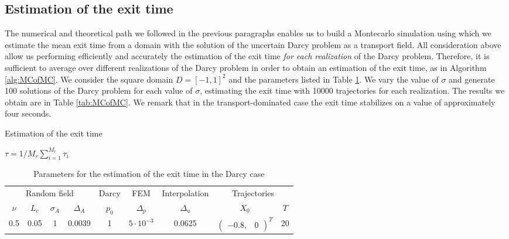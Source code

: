 \subsection{Estimation of the exit time}

The numerical and theoretical path we followed in the previous paragraphs enables us to build a Montecarlo simulation using which we estimate the mean exit time from a domain with the solution of the uncertain Darcy problem as a transport field. All consideration above allow us performing efficiently and accurately the estimation of the exit time \textit{for each realization} of the Darcy problem. Therefore, it is sufficient to average over different realizations of the Darcy problem in order to obtain an estimation of the exit time, as in Algorithm \ref{alg:MCofMC}. We consider the square domain $D = [-1, 1]^2$ and the parameters listed in Table \ref{tab:MCPar}. We vary the value of $\sigma$ and generate 100 solutions of the Darcy problem for each value of $\sigma$, estimating the exit time with 10000 trajectories for each realization. The results we obtain are in Table \ref{tab:MCofMC}. We remark that in the transport-dominated case the exit time stabilizes on a value of approximately four seconds.

\begin{algorithm}[t]
\caption{Estimation of the exit time}
$\tau = 1/M_r \sum_{i = 1}^{M_r} \tau_i$ \;
\label{alg:MCofMC}
\end{algorithm}

\begin{table}[h]
\centering
\begin{tabular}{ccccccccc}
\toprule
\multicolumn{4}{c}{Random field} & \multicolumn{1}{c}{Darcy} & \multicolumn{1}{c}{FEM} & \multicolumn{1}{c}{Interpolation} & \multicolumn{2}{c}{Trajectories} \\ 
\cmidrule{1-4} \cmidrule{8-9}
$\nu$    & $L_c$ & $\sigma_A$ & $\Delta_A$ & $p_0$ & $\Delta_p$ & $\Delta_u$ & $X_0$ & $T$ \\
\midrule
0.5 & 0.05 & 1 & 0.0039 & 1 & $5\cdot 10^{-3}$ & 0.0625 & $\begin{pmatrix} -0.8, & 0 \end{pmatrix}^T$ & 20\\
\bottomrule
\end{tabular}
\caption{Parameters for the estimation of the exit time in the Darcy case}
\label{tab:MCPar}
\end{table}

